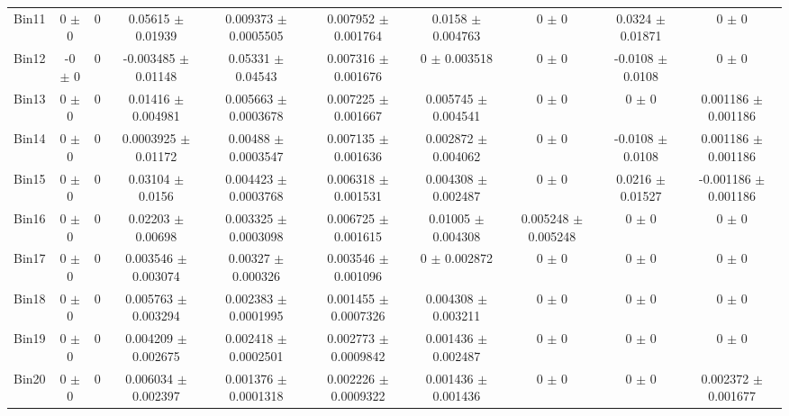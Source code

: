 \begin{tabular}{@{\extracolsep{4pt}}lccccccccc@{}}
     Bin11 & 0 $\pm$ 0 & 0 & 0.05615 $\pm$ 0.01939 & 0.009373 $\pm$ 0.0005505 & 0.007952 $\pm$ 0.001764 & 0.0158 $\pm$ 0.004763 & 0 $\pm$ 0 & 0.0324 $\pm$ 0.01871 & 0 $\pm$ 0 \\ 
     Bin12 & -0 $\pm$ 0 & 0 & -0.003485 $\pm$ 0.01148 & 0.05331 $\pm$ 0.04543 & 0.007316 $\pm$ 0.001676 & 0 $\pm$ 0.003518 & 0 $\pm$ 0 & -0.0108 $\pm$ 0.0108 & 0 $\pm$ 0 \\ 
     Bin13 & 0 $\pm$ 0 & 0 & 0.01416 $\pm$ 0.004981 & 0.005663 $\pm$ 0.0003678 & 0.007225 $\pm$ 0.001667 & 0.005745 $\pm$ 0.004541 & 0 $\pm$ 0 & 0 $\pm$ 0 & 0.001186 $\pm$ 0.001186 \\ 
     Bin14 & 0 $\pm$ 0 & 0 & 0.0003925 $\pm$ 0.01172 & 0.00488 $\pm$ 0.0003547 & 0.007135 $\pm$ 0.001636 & 0.002872 $\pm$ 0.004062 & 0 $\pm$ 0 & -0.0108 $\pm$ 0.0108 & 0.001186 $\pm$ 0.001186 \\ 
     Bin15 & 0 $\pm$ 0 & 0 & 0.03104 $\pm$ 0.0156 & 0.004423 $\pm$ 0.0003768 & 0.006318 $\pm$ 0.001531 & 0.004308 $\pm$ 0.002487 & 0 $\pm$ 0 & 0.0216 $\pm$ 0.01527 & -0.001186 $\pm$ 0.001186 \\ 
     Bin16 & 0 $\pm$ 0 & 0 & 0.02203 $\pm$ 0.00698 & 0.003325 $\pm$ 0.0003098 & 0.006725 $\pm$ 0.001615 & 0.01005 $\pm$ 0.004308 & 0.005248 $\pm$ 0.005248 & 0 $\pm$ 0 & 0 $\pm$ 0 \\ 
     Bin17 & 0 $\pm$ 0 & 0 & 0.003546 $\pm$ 0.003074 & 0.00327 $\pm$ 0.000326 & 0.003546 $\pm$ 0.001096 & 0 $\pm$ 0.002872 & 0 $\pm$ 0 & 0 $\pm$ 0 & 0 $\pm$ 0 \\ 
     Bin18 & 0 $\pm$ 0 & 0 & 0.005763 $\pm$ 0.003294 & 0.002383 $\pm$ 0.0001995 & 0.001455 $\pm$ 0.0007326 & 0.004308 $\pm$ 0.003211 & 0 $\pm$ 0 & 0 $\pm$ 0 & 0 $\pm$ 0 \\ 
     Bin19 & 0 $\pm$ 0 & 0 & 0.004209 $\pm$ 0.002675 & 0.002418 $\pm$ 0.0002501 & 0.002773 $\pm$ 0.0009842 & 0.001436 $\pm$ 0.002487 & 0 $\pm$ 0 & 0 $\pm$ 0 & 0 $\pm$ 0 \\ 
     Bin20 & 0 $\pm$ 0 & 0 & 0.006034 $\pm$ 0.002397 & 0.001376 $\pm$ 0.0001318 & 0.002226 $\pm$ 0.0009322 & 0.001436 $\pm$ 0.001436 & 0 $\pm$ 0 & 0 $\pm$ 0 & 0.002372 $\pm$ 0.001677 \\ 
\hline\hline
  \end{tabular}
